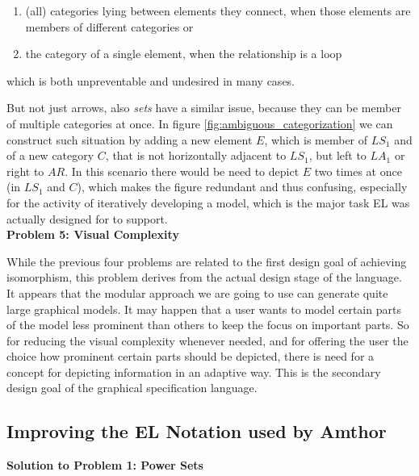 \documentclass[twoside, openright, 12pt]{book}
\begin{document}
\begin{enumerate}[label=\alph*)]
\item (all) categories lying between elements they connect, when those elements are members of different categories or 
\item the category of a single element, when the relationship is a loop
\end{enumerate}

\noindent
which is both unpreventable and undesired in many cases.

But not just arrows, also \textit{sets} have a similar issue, because they can be member of multiple categories at once.
In figure \ref{fig:ambiguous_categorization} we can construct such situation by adding a new element $E$, which is member of $LS_1$ and of a new category $C$, that is not horizontally adjacent to $LS_1$, but left to $LA_1$ or right to $AR$.
In this scenario there would be need to depict $E$ two times at once (in $LS_1$ and $C$), which makes the figure redundant and thus confusing, especially for the activity of iteratively developing a model, which is the major task EL was actually designed for to support.\\



\vspace{6mm}
\noindent
\textbf{Problem 5: Visual Complexity}
\vspace{1mm}

\noindent
While the previous four problems are related to the first design goal of achieving isomorphism, this problem derives from the actual design stage of the language.
It appears that the modular approach we are going to use can generate quite large graphical models.
It may happen that a user wants to model certain parts of the model less prominent than others to keep the focus on important parts.
So for reducing the visual complexity whenever needed, and for offering the user the choice how prominent certain parts should be depicted, there is need for a concept for depicting information in an adaptive way.
This is the secondary design goal of the graphical specification language.



\subsection{Improving the EL Notation used by Amthor}
\label{improving_notation}
\vspace{2mm}
\noindent
\textbf{Solution to Problem 1: Power Sets}
\vspace{1mm}
\end{document}
